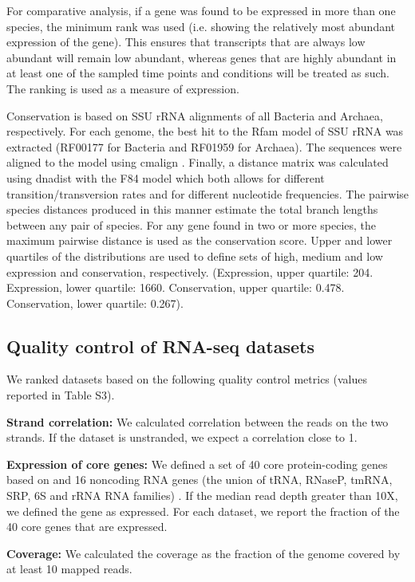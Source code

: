 \documentclass[10pt]{article}
\begin{document}
For comparative analysis, if a gene was found to be expressed in more
than one species, the minimum rank was used (i.e. showing the
relatively most abundant expression of the gene). This ensures that
transcripts that are always low abundant will remain low abundant,
whereas genes that are highly abundant in at least one of the sampled
time points and conditions will be treated as such. The ranking is
used as a measure of expression.

Conservation is based on SSU rRNA alignments of all Bacteria and
Archaea, respectively. For each genome, the best hit to the Rfam model
of SSU rRNA was extracted (RF00177 for Bacteria and RF01959 for
Archaea). The sequences were aligned to the model using cmalign
\cite{Nawrocki:2013}. Finally, a distance matrix was calculated using
dnadist \cite{FELS05} with the F84 model
\cite{Kishino:1989,Felsenstein:1996} which both allows for different
transition/transversion rates and for different nucleotide
frequencies. The pairwise species distances produced in this manner
estimate the total branch lengths between any pair of species. For any
gene found in two or more species, the maximum pairwise distance is
used as the conservation score. Upper and lower quartiles of the
distributions are used to define sets of high, medium and low
expression and conservation, respectively. (Expression, upper
quartile: 204. Expression, lower quartile: 1660. Conservation, upper
quartile: 0.478. Conservation, lower quartile: 0.267).

\subsection*{Quality control of RNA-seq datasets}

We ranked datasets based on the following quality control metrics
(values reported in Table S3).
	
{\bf Strand correlation:} We calculated correlation between the reads
on the two strands. If the dataset is unstranded, we expect a
correlation close to 1.
	
{\bf Expression of core genes:} We defined a set of 40 core
protein-coding genes based on \cite{Wu:2013,Darling:2014} and 16 noncoding RNA
genes (the union of tRNA, RNaseP, tmRNA, SRP, 6S and rRNA RNA
families) \cite{Gardner:2011,Burge:2013}. If the median read depth
greater than 10X, we defined the gene as expressed. For each dataset,
we report the fraction of the 40 core genes that are expressed.
	
{\bf Coverage:} We calculated the coverage as the fraction of the
genome covered by at least 10 mapped reads.
	
\end{document}

